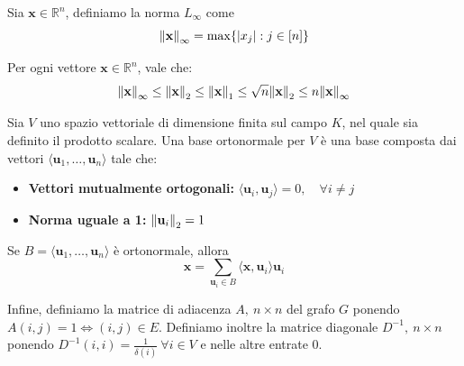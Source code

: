\begin{definizione}
    Sia $\mathbf{x} \in \mathbb{R}^n$, definiamo la norma $L_\infty$ come
    \[
        \norm{\mathbf{x}}_\infty = \max \{ |x_j|: j \in [n] \}
    \]
\end{definizione}

\begin{lemma}
    Per ogni vettore $\mathbf{x} \in \mathbb{R}^n$, vale che:
    \[
        \norm{\mathbf{x}}_\infty \leq \norm{\mathbf{x}}_2 \leq \norm{\mathbf{x}}_1 \leq \sqrt{n}\norm{\mathbf{x}}_2 \leq n\norm{\mathbf{x}}_\infty
    \]
\end{lemma}

\begin{definizione}
    Sia $V$ uno spazio vettoriale di dimensione finita sul campo $K$, nel quale sia definito il prodotto scalare. Una base ortonormale per $V$ è una base composta dai vettori $\langle \mathbf{u}_1, \dots, \mathbf{u}_n \rangle$ tale che:
    \begin{itemize}
        \item \textbf{Vettori mutualmente ortogonali:} $\langle \mathbf{u}_i, \mathbf{u}_j \rangle = 0, \quad \forall i \neq j$
        \item \textbf{Norma uguale a 1:} $\norm{\mathbf{u}_i}_2 = 1$
    \end{itemize}
\end{definizione}
Se $B = \langle \mathbf{u}_1, \dots, \mathbf{u}_n \rangle$ è ortonormale, allora
\[    
    \mathbf{x} = \sum_{\mathbf{u}_i \in B} \langle \mathbf{x}, \mathbf{u}_i \rangle \mathbf{u}_i
\]

Infine, definiamo la matrice di adiacenza $A,\ n \times n$ del grafo $G$ ponendo $A(i, j) = 1 \iff (i, j) \in E$. Definiamo inoltre la matrice diagonale $D^{-1},\ n \times n$ ponendo $D^{-1}(i, i) =  \frac{1}{\delta(i)}\ \forall i \in V$ e nelle altre entrate 0.

